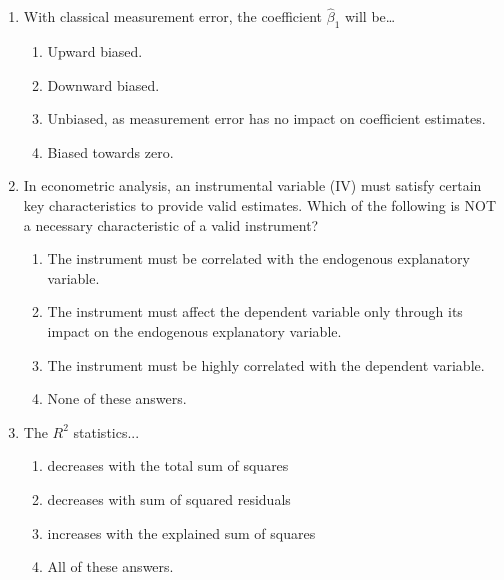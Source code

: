 \documentclass{article}
\begin{document}
\begin{enumerate}
    \item With classical measurement error, the coefficient $\hat{\beta}_1$ will be…
    \begin{enumerate}[label=\alph*)]
        \item Upward biased.
        \item Downward biased.
        \item Unbiased, as measurement error has no impact on coefficient estimates.
        \item Biased towards zero. %
    \end{enumerate}\vspace{.25cm}


    \item In econometric analysis, an instrumental variable (IV) must satisfy certain key characteristics to provide valid estimates. Which of the following is NOT a necessary characteristic of a valid instrument?
    \begin{enumerate}[label=\alph*)]
        \item The instrument must be correlated with the endogenous explanatory variable.
        \item  The instrument must affect the dependent variable only through its impact on the endogenous explanatory variable.
        \item The instrument must be highly correlated with the dependent variable.
        \item None of these answers.
    \end{enumerate}\vspace{.25cm}

\newpage
    \item The $R^2$ statistics...
    \begin{enumerate}[label=\alph*)]
        \item decreases with the total sum of squares
        \item decreases with sum of squared residuals
        \item increases with the explained sum of squares
        \item All of these answers.
    \end{enumerate}\vspace{.25cm}



\end{enumerate}
\end{document}
